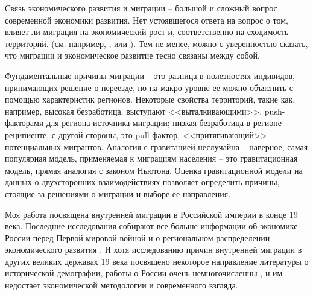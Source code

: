\documentclass[a4paper,12pt]{article}
\begin{document}

Связь экономического развития и миграции -- большой и сложный вопрос современной экономики развития.
Нет устоявшегося ответа на вопрос о том, влияет ли миграция на экономический рост и, соответственно на сходимость территорий. (см. например, \cite{barro_convergence_1992}, или \cite{nybergsorensen_nexus_2002}).
Тем не менее, можно с уверенностью сказать, что миграции и экономическое развитие тесно связаны между собой.

Фундаментальные причины миграции -- это разница в полезностях индивидов, принимающих решение о переезде, но на макро-уровне ее можно объяснить с помощью характеристик регионов. 
Некоторые свойства территорий, такие как, например, высокая безработица, выступают <<выталкивающими>>, push-факторами для региона-источника миграции; низкая безработица в регионе-реципиенте, с другой стороны, это pull-фактор, <<притягивающий>> потенциальных мигрантов. Аналогия с гравитацией неслучайна -- наверное, самая популярная модель, применяемая к миграциям населения -- это гравитационная модель, прямая аналогия с законом Ньютона. Оценка гравитационной модели на данных о двухсторонних взаимодействиях позволяет определить причины, стоящие за решениями о миграции и выборе ее направления.

Моя работа посвящена внутренней миграции в Российской империи в конце 19 века. Последние исследования собирают все больше информации об экономике России перед Первой мировой войной \citep{markevich_abolition_2018, cheremukhin_industrialization_2017} и о региональном распределении экономического развития \citep{markevich_regional_2019, lindert_inequality_2014}.
И хотя исследованию причин внутренней миграции в других великих державах 19 века посвящено некоторое направление литературы о исторической демографии, работы о России очень немногочисленны \citep{anderson_internal_1980, leasure_internal_1968}, и им недостает экономической методологии и современного взгляда.
\end{document}
